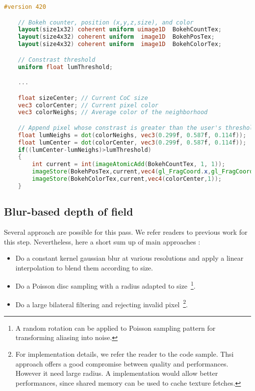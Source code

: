 \begin{lstlisting}[language=GLSL,float={htb},caption={Fragment shader for extracting bokehs.},label={YourName:listing1}]
	#version 420

	// Bokeh counter, position (x,y,z,size), and color
	layout(size1x32) coherent uniform uimage1D 	BokehCountTex;
	layout(size4x32) coherent uniform  image1D 	BokehPosTex;
	layout(size4x32) coherent uniform  image1D 	BokehColorTex;

	// Constrast threshold
	uniform float lumThreshold;

	...

	float sizeCenter; // Current CoC size
	vec3 colorCenter; // Current pixel color
	vec3 colorNeighs; // Average color of the neighborhood

	// Append pixel whose constrast is greater than the user's threshold
	float lumNeighs = dot(colorNeighs, vec3(0.299f, 0.587f, 0.114f));
	float lumCenter = dot(colorCenter, vec3(0.299f, 0.587f, 0.114f));
	if((lumCenter-lumNeighs)>lumThreshold)
	{
		int current = int(imageAtomicAdd(BokehCountTex, 1, 1));
		imageStore(BokehPosTex,current,vec4(gl_FragCoord.x,gl_FragCoord.y,gl_FragCoord.z,sizeCenter));
		imageStore(BokehColorTex,current,vec4(colorCenter,1));
	}
\end{lstlisting}


\subsection{Blur-based depth of field}
Several approach are possible for this pass. We refer readers to previous work for this step. Nevertheless, here a short sum up of main approaches :
\begin{itemize}
	\item Do a constant kernel gaussian blur at various resolutions and apply a linear interpolation to blend them according to \coc size.
	\item Do a Poisson disc sampling with a radius adapted to \coc size~\footnote{A random rotation can be applied to Poisson sampling pattern for transforming aliasing into noise.}.
	\item Do a large bilateral filtering and rejecting invalid pixel~\footnote{For implementation details, we refer the reader to the code sample. Thsi approach offers a good compromise between quality and performances. However it need large radius. A \opencl implementation would allow better performances, since shared memory can be used to cache texture fetches.}.
\end{itemize}


